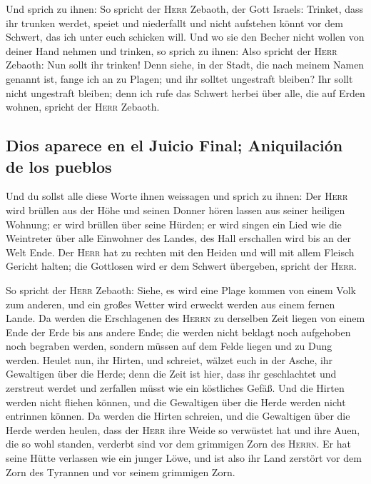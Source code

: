  Und sprich zu ihnen: So spricht der \textsc{Herr}
Zebaoth, der Gott Israels: Trinket, dass ihr trunken werdet, speiet und
niederfallt und nicht aufstehen könnt vor dem Schwert, das ich unter
euch schicken will.  Und wo sie den Becher nicht wollen
von deiner Hand nehmen und trinken, so sprich zu ihnen: Also spricht der
\textsc{Herr} Zebaoth: Nun sollt ihr trinken!  Denn
siehe, in der Stadt, die nach meinem Namen genannt ist, fange ich an zu
Plagen; und ihr solltet ungestraft bleiben? Ihr sollt nicht ungestraft
bleiben; denn ich rufe das Schwert herbei über alle, die auf Erden
wohnen, spricht der \textsc{Herr} Zebaoth.

\hypertarget{dios-aparece-en-el-juicio-final-aniquilaciuxf3n-de-los-pueblos}{%
\subsection{Dios aparece en el Juicio Final; Aniquilación de los
pueblos}\label{dios-aparece-en-el-juicio-final-aniquilaciuxf3n-de-los-pueblos}}

 Und du sollst alle diese Worte ihnen weissagen und
sprich zu ihnen: Der \textsc{Herr} wird brüllen aus der Höhe und seinen
Donner hören lassen aus seiner heiligen Wohnung; er wird brüllen über
seine Hürden; er wird singen ein Lied wie die Weintreter über alle
Einwohner des Landes, des Hall erschallen wird bis an der Welt Ende.
 Der \textsc{Herr} hat zu rechten mit den Heiden und will
mit allem Fleisch Gericht halten; die Gottlosen wird er dem Schwert
übergeben, spricht der \textsc{Herr}.

 So spricht der \textsc{Herr} Zebaoth: Siehe, es wird
eine Plage kommen von einem Volk zum anderen, und ein großes Wetter wird
erweckt werden aus einem fernen Lande.  Da werden die
Erschlagenen des \textsc{Herrn} zu derselben Zeit liegen von einem Ende
der Erde bis ans andere Ende; die werden nicht beklagt noch aufgehoben
noch begraben werden, sondern müssen auf dem Felde liegen und zu Dung
werden.  Heulet nun, ihr Hirten, und schreiet, wälzet
euch in der Asche, ihr Gewaltigen über die Herde; denn die Zeit ist
hier, dass ihr geschlachtet und zerstreut werdet und zerfallen müsst wie
ein köstliches Gefäß.  Und die Hirten werden nicht
fliehen können, und die Gewaltigen über die Herde werden nicht entrinnen
können.  Da werden die Hirten schreien, und die
Gewaltigen über die Herde werden heulen, dass der \textsc{Herr} ihre
Weide so verwüstet hat  und ihre Auen, die so wohl
standen, verderbt sind vor dem grimmigen Zorn des \textsc{Herrn}.
 Er hat seine Hütte verlassen wie ein junger Löwe, und
ist also ihr Land zerstört vor dem Zorn des Tyrannen und vor seinem
grimmigen Zorn.

